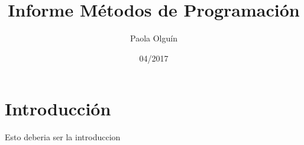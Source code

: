\documentclass{article}
\title{Informe M\'etodos de Programaci\'on}
\date{04/2017}
\author{Paola Olgu\'in}
\begin{document}

  \renewcommand*\contentsname{\'Indice}

  \maketitle{}

  \newpage


  \tableofcontents{}

  \section{Introducci\'on}
  Esto deberia ser la introduccion
\end{document}
